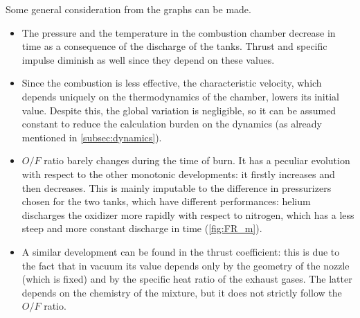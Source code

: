 
Some general consideration from the graphs can be made.
\begin{itemize}
    \item The pressure and the temperature in the combustion chamber decrease in time as a consequence of the discharge of the tanks. Thrust and specific impulse diminish as well since they depend on these values.
    \item Since the combustion is less effective, the characteristic velocity, which depends uniquely on the thermodynamics of the chamber, lowers its initial value. Despite this, the global variation is negligible, so it can be assumed constant to reduce the calculation burden on the dynamics (as already mentioned in \autoref{subsec:dynamics}).
    \item $O/F$ ratio barely changes during the time of burn. It has a peculiar evolution with respect to the other monotonic developments: it firstly increases and then decreases. This is mainly imputable to the difference in pressurizers chosen for the two tanks, which have different performances: helium discharges the oxidizer more rapidly with respect to nitrogen, which has a less steep and more constant discharge in time (\autoref{fig:FR_m}).
    \item A similar development can be found in the thrust coefficient: this is due to the fact that in vacuum its value depends only by the geometry of the nozzle (which is fixed) and by the specific heat ratio of the exhaust gases. The latter depends on the chemistry of the mixture, but it does not strictly follow the $O/F$ ratio.
\end{itemize}